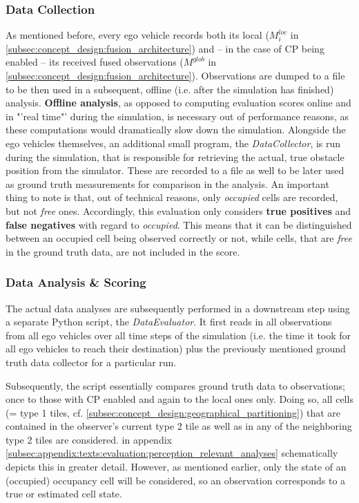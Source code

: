 \subsubsection{Data Collection}
As mentioned before, every ego vehicle records both its local ($M_i^{loc}$ in \cref{subsec:concept_design:fusion_architecture}) and – in the case of CP being enabled – its received fused observations ($M^{glob}$ in \cref{subsec:concept_design:fusion_architecture}). Observations are dumped to a file to be then used in a subsequent, offline (i.e. after the simulation has finished) analysis. \textbf{Offline analysis}, as opposed to computing evaluation scores online and in "'real time"' during the simulation, is necessary out of performance reasons, as these computations would dramatically slow down the simulation. Alongside the ego vehicles themselves, an additional small program, the \textit{DataCollector}, is run during the simulation, that is responsible for retrieving the actual, true obstacle position from the simulator. These are recorded to a file as well to be later used as ground truth measurements for comparison in the analysis. An important thing to note is that, out of technical reasons, only \textit{occupied} cells are recorded, but not \textit{free} ones. Accordingly, this evaluation only considers \textbf{true positives} and \textbf{false negatives} with regard to \textit{occupied}. This means that it can be distinguished between an occupied cell being observed correctly or not, while cells, that are \textit{free} in the ground truth data, are not included in the score.
\par
\bigskip

\subsubsection{Data Analysis \& Scoring}
The actual data analyses are subsequently performed in a downstream step using a separate Python script, the \textit{DataEvaluator}. It first reads in all observations from all ego vehicles over all time steps of the simulation (i.e. the time it took for all ego vehicles to reach their destination) plus the previously mentioned ground truth data collector for a particular run.

Subsequently, the script essentially compares ground truth data to observations; once to those with CP enabled and again to the local ones only. Doing so, all cells (= type 1 tiles, cf. \cref{subsec:concept_design:geographical_partitioning}) that are contained in the observer's current type 2 tile as well as in any of the neighboring type 2 tiles are considered.  in appendix \cref{subsec:appendix:texts:evaluation:perception_relevant_analyses} schematically depicts this in greater detail. However, as mentioned earlier, only the state of an (occupied) occupancy cell will be considered, so an observation corresponds to a true or estimated cell state. 

